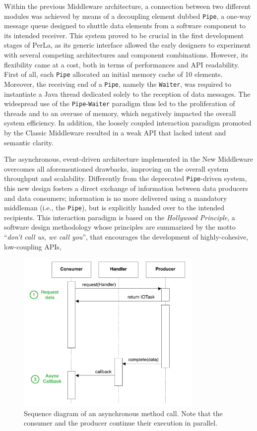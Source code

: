 Within the previous Middleware architecture, a connection between two different
modules was achieved by means of a decoupling element dubbed \texttt{Pipe}, a
one-way message queue designed to shuttle data elements from a software
component to its intended receiver. This system proved to be crucial in the
first development stages of PerLa, as its generic interface allowed the early
designers to experiment with several competing architectures and component
combinations. However, its flexibility came at a cost, both in terms of
performances and API readability. First of all, each \texttt{Pipe} allocated an
initial memory cache of 10 elements. Moreover, the receiving end of a
\texttt{Pipe}, namely the \texttt{Waiter}, was required to instantiate a Java
thread dedicated solely to the reception of data messages. The widespread use
of the \texttt{Pipe}-\texttt{Waiter} paradigm thus led to the proliferation of
threads and to an overuse of memory, which negatively impacted the overall
system efficiency. In addition, the loosely coupled interaction paradigm
promoted by the Classic Middleware resulted in a weak API that lacked intent
and semantic clarity.

The asynchronous, event-driven architecture implemented in the New Middleware
overcomes all aforementioned drawbacks, improving on the overall system
throughput and scalability. Differently from the deprecated
\texttt{Pipe}-driven system, this new design fosters a direct exchange of
information between data producers and data consumers; information is no more
delivered using a mandatory middleman (i.e., the \texttt{Pipe}), but is
explicitly handed over to the intended recipients. This interaction paradigm is
based on the \textit{Hollywood Principle}, a software design methodology whose
principles are summarized by the motto ``\textit{don't call us, we call you}'',
that encourages the development of highly-cohesive, low-coupling APIs, 

\begin{figure}[h!]
\center
\includegraphics[width=0.8\textwidth]{imgs/async_paradigm.pdf}
\caption{Sequence diagram of an asynchronous method call. Note that the
consumer and the producer continue their execution in parallel.}
\label{fig:async_paradigm}
\end{figure}


